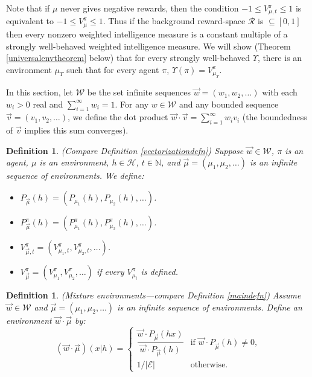 \documentclass[twoside]{article}
\newtheorem{definition}[theorem]{Definition}
\begin{document}
Note that if $\mu$ never gives negative rewards, then the condition
$-1\leq V^\pi_{\mu,t}\leq 1$ is equivalent to $-1\leq V^\pi_\mu\leq 1$.
Thus if the background reward-space $\mathcal R$ is $\subseteq [0,1]$
then every nonzero weighted intelligence measure
is a constant multiple of a strongly well-behaved weighted intelligence
measure.
We will show (Theorem \ref{universalenvtheorem} below)
that for every strongly well-behaved $\Upsilon$,
there is an environment $\mu_\Upsilon$ such that for every agent $\pi$,
$\Upsilon(\pi)=V^\pi_{\mu_\Upsilon}$.

In this section, let $\mathscr W$ be the set infinite sequences
$\vec w=(w_1,w_2,\ldots)$ with each $w_i>0$ real and
$\sum_{i=1}^\infty w_i=1$. For any $w\in\mathscr W$ and any
bounded sequence $\vec v=(v_1,v_2,\ldots)$, we define the dot
product $\vec w\cdot\vec v=\sum_{i=1}^\infty w_iv_i$ (the boundedness
of $\vec v$ implies this sum converges).

\begin{definition}
\label{infinitedimensionalvectorizationdefn}
    (Compare Definition \ref{vectorizationdefn})
    Suppose $\vec w\in\mathscr W$, $\pi$ is an agent, $\mu$ is an environment,
    $h\in\mathcal H$, $t\in\mathbb N$,
    and $\vec\mu=(\mu_1,\mu_2,\ldots)$ is an infinite sequence of environments.
    We define:
    \begin{itemize}
        \item
            $P_{\vec\mu}(h)=(P_{\mu_1}(h),P_{\mu_2}(h),\ldots)$.
        \item
            $P^\pi_{\vec\mu}(h)=(P^\pi_{\mu_1}(h),P^\pi_{\mu_2}(h),\ldots)$.
        \item
            $V^\pi_{\vec\mu,t}=(V^\pi_{\mu_1,t},V^\pi_{\mu_2,t},\ldots)$.
        \item
            $V^\pi_{\vec\mu}=(V^\pi_{\mu_1},V^\pi_{\mu_2},\ldots)$ if
            every $V^\pi_{\mu_i}$ is defined.
    \end{itemize}
\end{definition}

\begin{definition}
\label{mixtureenvdefn}
    (Mixture environments---compare Definition \ref{maindefn})
    Assume $\vec w\in\mathscr W$ and $\vec\mu=(\mu_1,\mu_2,\ldots)$ is an infinite
    sequence of environments. Define an environment $\vec w\cdot\vec\mu$ by:
    \[
        (\vec w\cdot \vec\mu)(x|h)
        =
        \begin{cases}
            \dfrac{\vec w\cdot P_{\vec\mu}(hx)}{\vec w\cdot P_{\vec\mu}(h)}
            &\mbox{if $\vec w\cdot P_{\vec\mu}(h)\not=0$,}\\
            1/|\mathcal E| &\mbox{otherwise.}
        \end{cases}
    \]
\end{definition}
\end{document}
